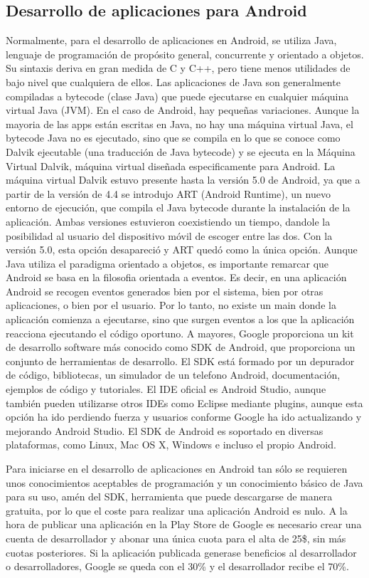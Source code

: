 \documentclass[
10pt, %
a4paper, %
oneside, %
headinclude,footinclude, %
BCOR5mm, %
]{scrartcl}
\begin{document}
\subsection{Desarrollo de aplicaciones para Android}
Normalmente, para el desarrollo de aplicaciones en Android, se utiliza Java, lenguaje de programación de propósito general, concurrente y orientado a objetos. Su sintaxis deriva en gran medida de C y C++, pero tiene menos utilidades de bajo nivel que cualquiera de ellos. Las aplicaciones de Java son generalmente compiladas a bytecode (clase Java) que puede ejecutarse en cualquier máquina virtual Java (JVM). En el caso de Android, hay pequeñas variaciones. Aunque la mayoria de las apps están escritas en Java, no hay una máquina virtual Java, el bytecode Java no es ejecutado, sino que se compila en lo que se conoce como Dalvik ejecutable (una traducción de Java bytecode) y se ejecuta en la Máquina Virtual Dalvik, máquina virtual diseñada especificamente para Android. La máquina virtual Dalvik estuvo presente hasta la versión 5.0 de Android, ya que a partir de la versión de 4.4 se introdujo ART (Android Runtime), un nuevo entorno de ejecución, que compila el Java bytecode durante la instalación de la aplicación. Ambas versiones estuvieron coexistiendo un tiempo, dandole la posibilidad al usuario del dispositivo móvil de escoger entre las dos. Con la versión 5.0, esta opción desapareció y ART quedó como la única opción. Aunque Java utiliza el paradigma orientado a objetos, es importante remarcar que Android se basa en la filosofia orientada a eventos. Es decir, en una aplicación Android se recogen eventos generados bien por el sistema, bien por otras aplicaciones, o bien por el usuario. Por lo tanto, no existe un main donde la aplicación comienza a ejecutarse, sino que surgen eventos a los que la aplicación reacciona ejecutando el código oportuno.  A mayores, Google proporciona un kit de desarrollo software más conocido como SDK de Android, que proporciona un conjunto de herramientas de desarrollo. El SDK está formado por un depurador de código, bibliotecas, un simulador de un telefono Android, documentación, ejemplos de código y tutoriales. El IDE oficial es Android Studio, aunque también pueden utilizarse otros IDEs como Eclipse mediante plugins, aunque esta opción ha ido perdiendo fuerza y usuarios conforme Google ha ido actualizando y mejorando Android Studio. El SDK de Android es soportado en diversas plataformas, como Linux, Mac OS X, Windows e incluso el propio Android.

Para iniciarse en el desarrollo de aplicaciones en Android tan sólo se requieren unos conocimientos aceptables de programación y un conocimiento básico de Java para su uso, amén del SDK, herramienta que puede descargarse de manera gratuita, por lo que el coste para realizar una aplicación Android es nulo. A la hora de publicar una aplicación en la Play Store de Google es necesario crear una cuenta de desarrollador y abonar una única cuota para el alta de 25\$, sin más cuotas posteriores. Si la aplicación publicada generase beneficios al desarrollador o desarrolladores, Google se queda con el 30\% y el desarrollador recibe el 70\%.
\end{document}
